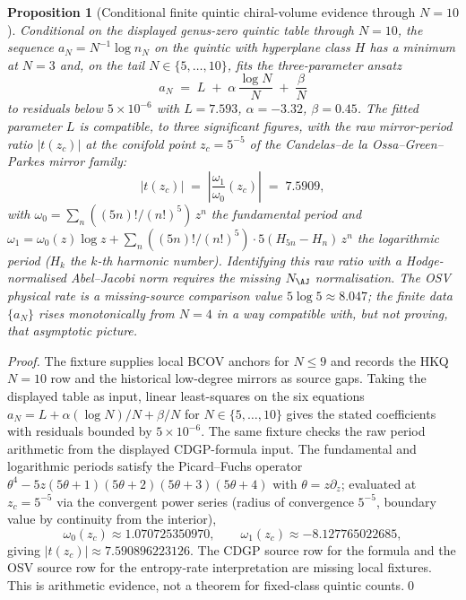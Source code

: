\documentclass[12pt]{amsart}
\newtheorem{prop}[thm]{Proposition}
\theoremstyle{remark}
\begin{document}
\begin{prop}[Conditional finite quintic chiral-volume evidence through $N = 10$]
  \label{prop:chiral-volume-quintic}
  Conditional on the displayed genus-zero quintic table through \(N=10\),
  the sequence $a_N = N^{-1} \log n_N$ on the quintic with hyperplane
  class $H$ has a minimum at $N = 3$ and, on the tail
  $N \in \{5, \dots, 10\}$, fits the three-parameter ansatz
  $$a_N \;=\; L \;+\; \alpha\, \frac{\log N}{N} \;+\; \frac{\beta}{N}$$
  to residuals below $5 \times 10^{-6}$ with
  $L = 7.593$, $\alpha = -3.32$, $\beta = 0.45$. The fitted
  parameter \(L\) is compatible, to three significant figures, with the
  raw mirror-period ratio $|t(z_c)|$ at the conifold point
  $z_c = 5^{-5}$ of the Candelas--de la Ossa--Green--Parkes mirror
  family:
  $$|t(z_c)| \;=\; \left|\frac{\omega_1}{\omega_0}(z_c)\right|
    \;=\; 7.5909,$$
  with $\omega_0 = \sum_n ((5n)!/(n!)^5)\, z^n$ the fundamental period
  and $\omega_1 = \omega_0(z) \log z + \sum_n ((5n)!/(n!)^5) \cdot
  5(H_{5n} - H_n)\, z^n$ the logarithmic period ($H_k$ the $k$-th
  harmonic number). Identifying this raw ratio with a Hodge-normalised
  Abel--Jacobi norm requires the missing \(N_{\AJ}\) normalisation. The
  OSV physical rate is a missing-source comparison value
  $5 \log 5 \approx 8.047$; the finite data $\{a_N\}$ rises monotonically
  from $N = 4$ in a way compatible with, but not proving, that
  asymptotic picture.
\end{prop}

\begin{proof}
  The fixture
  supplies local BCOV anchors for \(N\leq9\) and records the HKQ
  \(N=10\) row and the historical low-degree mirrors as source gaps.
  Taking the displayed table as input, linear least-squares on the six equations
  $a_N = L + \alpha (\log N)/N + \beta / N$ for
  $N \in \{5, \dots, 10\}$ gives the stated coefficients with
  residuals bounded by $5 \times 10^{-6}$. The same fixture checks the
  raw period arithmetic from the displayed CDGP-formula input. The
  fundamental and logarithmic periods satisfy the Picard--Fuchs operator
  $\theta^4 - 5 z (5 \theta + 1)(5 \theta + 2)(5 \theta + 3)(5
  \theta + 4)$ with $\theta = z \partial_z$; evaluated at
  $z_c = 5^{-5}$ via the convergent power series (radius of
  convergence $5^{-5}$, boundary value by continuity from the
  interior),
  $$\omega_0(z_c) \approx 1.070725350970, \qquad
    \omega_1(z_c) \approx -8.127765022685,$$
  giving $|t(z_c)| \approx 7.590896223126$. The CDGP source row for the
  formula and the OSV source row for the entropy-rate interpretation are
  missing local fixtures. This is arithmetic evidence, not a theorem for
  fixed-class quintic counts.\qed
\end{proof}
\end{document}
